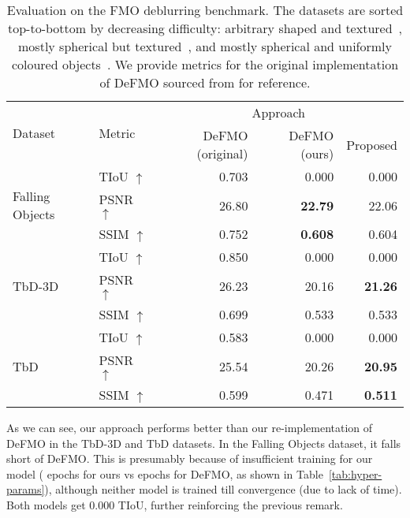     \begin{table}
        \caption{
            Evaluation on the FMO deblurring benchmark.
            The datasets are sorted top-to-bottom by decreasing difficulty: arbitrary shaped and textured~\citep{falling-objs}, mostly spherical but textured~\citep{tbd-3d}, and mostly spherical and uniformly coloured objects~\citep{tbd}.
            We provide metrics for the original implementation of DeFMO sourced from \citet{defmo} for reference.
        }%
        \label{tab:benchmark}
        \centering
        \begin{tabular}{llrrr}
            \toprule
            \multirow{2}[2]{*}{Dataset} & \multirow{2}[2]{*}{Metric} & \multicolumn{3}{c}{Approach}\\
            \cmidrule(lr){3-5}
            && DeFMO (original) & DeFMO (ours) & Proposed\\
            \midrule
            \multirow{3}{*}{Falling Objects} & TIoU $\uparrow$ & 0.703 & 0.000 & 0.000\\
            & PSNR $\uparrow$ & 26.80 & \textbf{22.79} & 22.06\\
            & SSIM $\uparrow$ & 0.752 & \textbf{0.608} & 0.604\\
            \midrule
            \multirow{3}{*}{TbD-3D} & TIoU $\uparrow$ & 0.850 & 0.000 & 0.000\\
            & PSNR $\uparrow$ & 26.23 & 20.16 & \textbf{21.26}\\
            & SSIM $\uparrow$ & 0.699 & 0.533 & 0.533\\
            \midrule
            \multirow{3}{*}{TbD} & TIoU $\uparrow$ & 0.583 & 0.000 & 0.000 \\
            & PSNR $\uparrow$ & 25.54 & 20.26 & \textbf{20.95} \\
            & SSIM $\uparrow$ & 0.599 & 0.471 & \textbf{0.511}\\
            \bottomrule
        \end{tabular}
    \end{table}


    As we can see, our approach performs better than our re-implementation of DeFMO in the TbD-3D and TbD datasets.
    In the Falling Objects dataset, it falls short of DeFMO.\@
    This is presumably because of insufficient training for our model (\oursepochs{} epochs for ours vs  epochs for DeFMO, as shown in Table~\ref{tab:hyper-params}), although neither model is trained till convergence (due to lack of time).
    Both models get 0.000 TIoU, further reinforcing the previous remark.

